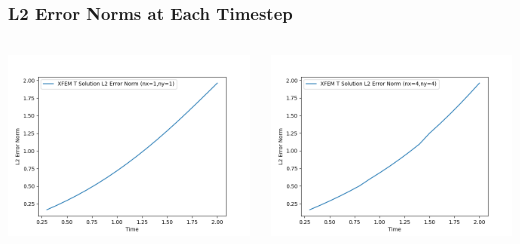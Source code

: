 \documentclass[]{beamer}
\begin{document}
\begin{frame}[t]\frametitle{L2 Error Norms at Each Timestep}
  	\begin{columns}
			\begin{center}
			\includegraphics[scale=0.4]{figures/2D_rz_ls1m/2D_rz_ls1mat_nx1ny1_L2_Errs}
			\end{center}
			\begin{center}
			\includegraphics[scale=0.4]{figures/2D_rz_ls1m/2D_rz_ls1mat_nx4ny4_L2_Errs}
			\end{center}
	\end{columns}
\end{frame}
\end{document}
